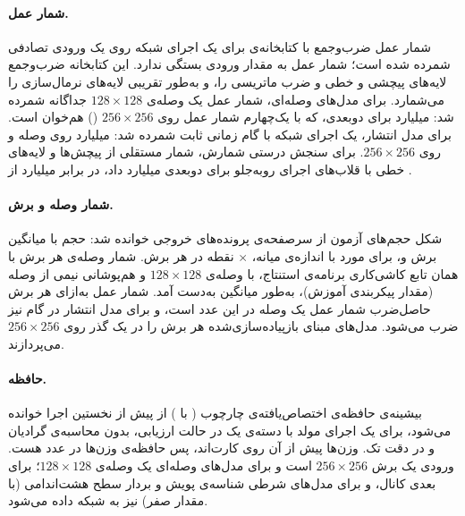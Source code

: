 \paragraph{شمار عمل.} شمار عمل ضرب‌وجمع با کتابخانه‌ی  برای یک اجرای شبکه روی یک ورودی تصادفی شمرده شده است؛ شمار عمل به مقدار ورودی بستگی ندارد. این کتابخانه ضرب‌وجمع لایه‌های پیچشی و خطی و ضرب ماتریسی را، و به‌طور تقریبی لایه‌های نرمال‌سازی را می‌شمارد. برای مدل‌های وصله‌ای، شمار عمل یک وصله‌ی $128\times128$ جداگانه شمرده شد:  میلیارد برای  دوبعدی، که با یک‌چهارم شمار عمل روی $256\times256$ () هم‌خوان است. برای مدل انتشار، یک اجرای شبکه با گام زمانی ثابت شمرده شد:  میلیارد روی وصله و  روی $256\times256$. برای سنجش درستی شمارش، شمار مستقلی از پیچش‌ها و لایه‌های خطی با قلاب‌های اجرای رو‌به‌جلو برای  دوبعدی  میلیارد داد، در برابر  میلیارد از .

\paragraph{شمار وصله و برش.} شکل حجم‌های آزمون از سرصفحه‌ی پرونده‌های خروجی خوانده شد:  حجم با میانگین  برش و، برای مورد با اندازه‌ی میانه، $\times$ نقطه در هر برش. شمار وصله‌ی هر برش با همان تابع کاشی‌کاری برنامه‌ی استنتاج، با وصله‌ی $128\times128$ و هم‌پوشانی نیمی از وصله (مقدار پیکربندی آموزش)، به‌طور میانگین  به‌دست آمد. شمار عمل به‌ازای هر برش حاصل‌ضرب شمار عمل یک وصله در این عدد است، و برای مدل انتشار در  گام نیز ضرب می‌شود. مدل‌های مبنای بازپیاده‌سازی‌شده هر برش را در یک گذر روی $256\times256$ می‌پردازند.

\paragraph{حافظه.} بیشینه‌ی حافظه‌ی اختصاص‌یافته‌ی چارچوب ( با ) از پیش از نخستین اجرا خوانده می‌شود، برای یک اجرای مولد با دسته‌ی یک در حالت ارزیابی، بدون محاسبه‌ی گرادیان و در دقت تک. وزن‌ها پیش از آن روی کارت‌اند، پس حافظه‌ی وزن‌ها در عدد هست. ورودی یک برش $256\times256$ است و برای مدل‌های وصله‌ای یک وصله‌ی $128\times128$؛ برای  ~بعدی  کانال، و برای مدل‌های شرطی شناسه‌ی پویش و بردار سطح هشت‌اندامی (با مقدار صفر) نیز به شبکه داده می‌شود.

